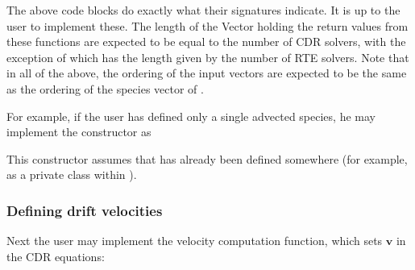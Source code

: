 \documentclass[letterpaper,10pt,english]{sphinxmanual}
\begin{document}
The above code blocks do exactly what their signatures indicate. It is up to the user to implement these. The length of the Vector holding the return values from these functions are expected to be equal to the number of CDR solvers, with the exception of  which has the length given by the number of RTE solvers. Note that in all of the above, the ordering of the input vectors are expected to be the same as the ordering of the species vector of {\hyperref[\detokenize{MinimalPlasmaModel:chap-cdr-plasma-physics}]{}}.

For example, if the user has defined only a single advected species, he may implement the constructor as

\begin{sphinxVerbatim}[commandchars=\\\{\},formatcom=\scriptsize]
     
     


   \PYG{p}{[}\PYG{p}{]}    
   \PYG{p}{[}\PYG{p}{]}    
\end{sphinxVerbatim}

This constructor assumes that  has already been defined somewhere (for example, as a private class within ).


\subsubsection{Defining drift velocities}
\label{\detokenize{MinimalPlasmaModel:defining-drift-velocities}}
Next the user may implement the velocity computation function, which sets \(\mathbf{v}\) in the CDR equations:
\end{document}
